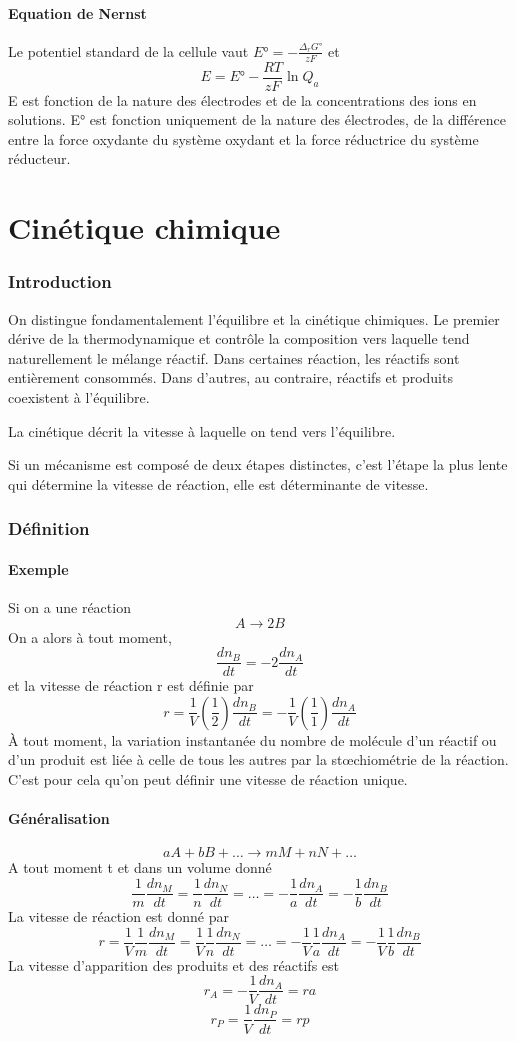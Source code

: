 \subsection{Equation de Nernst}
Le potentiel standard de la cellule vaut $E° = -\frac{\Delta_rG°}{zF}$ et
\[ E = E°-\frac{RT}{zF}\ln Q_a \]
E est fonction de la nature des électrodes et
de la concentrations des ions en solutions.
E° est fonction uniquement de la nature des électrodes,
de la différence entre la force oxydante du système oxydant et
la force réductrice du système réducteur.

\part{Cinétique chimique}
\section{Introduction}
On distingue fondamentalement l'équilibre et la cinétique chimiques.
Le premier dérive de la thermodynamique et contrôle la composition vers
laquelle tend naturellement le mélange réactif.
Dans certaines réaction, les réactifs sont entièrement consommés.
Dans d'autres, au contraire, réactifs et produits coexistent à l'équilibre.

La cinétique décrit la vitesse à laquelle on tend vers l'équilibre.

Si un mécanisme est composé de deux étapes distinctes,
c'est l'étape la plus lente qui détermine la vitesse de réaction,
elle est déterminante de vitesse.
\section{Définition}
\subsection{Exemple}
Si on a une réaction
\[ A \longrightarrow 2B \]
On  a alors à tout moment,
\[ \frac{dn_B}{dt} = -2\frac{dn_A}{dt} \]
et la vitesse de réaction r est définie par
\[ r = \frac 1V \left(\frac 12 \right)\frac{dn_B}{dt} =
-\frac 1V \left(\frac 11 \right) \frac{dn_A}{dt} \]
À tout moment, la variation instantanée du nombre de molécule d'un
réactif ou d'un produit est liée à celle de tous les autres
par la stœchiométrie de la réaction.
C'est pour cela qu'on peut définir une vitesse de réaction unique.

\subsection{Généralisation}
\[ aA+bB+\ldots \longrightarrow mM + nN + \ldots \]
A tout moment t et dans un volume donné
\[ \frac 1m \frac {dn_M}{dt} = \frac 1n \frac{dn_N}{dt} = \ldots =
-\frac 1a \frac{dn_A}{dt} = -\frac 1b \frac{dn_B}{dt} \]
La vitesse de réaction est donné par
\[ r = \frac 1V \frac 1m \frac {dn_M}{dt} =
\frac 1V \frac 1n \frac {dn_N}{dt} = \ldots =
-\frac 1V \frac 1a \frac {dn_A}{dt} = -\frac 1V \frac 1b \frac {dn_B}{dt} \]
La vitesse d'apparition des produits et des réactifs est
\[ r_A = -\frac 1V \frac {dn_A}{dt} = ra \]
\[ r_P = \frac 1V \frac {dn_P}{dt} = rp \]

